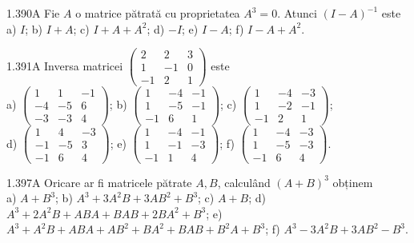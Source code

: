 \documentclass[11pt]{article}
\begin{document}
1.390A Fie $A$ o matrice pătrată cu proprietatea $A^{3}=0$. Atunci $(I-A)^{-1}$ este\\ a) $I$; b) $I+A$; c) $I+A+A^{2}$; d) $-I$; e) $I-A$; f) $I-A+A^{2}$.

1.391A Inversa matricei $\left(\begin{array}{ccc}2 & 2 & 3 \\ 1 & -1 & 0 \\ -1 & 2 & 1\end{array}\right)$ este\\ a) $\left(\begin{array}{ccc}1 & 1 & -1 \\ -4 & -5 & 6 \\ -3 & -3 & 4\end{array}\right)$; b) $\left(\begin{array}{ccc}1 & -4 & -1 \\ 1 & -5 & -1 \\ -1 & 6 & 1\end{array}\right)$; c) $\left(\begin{array}{ccc}1 & -4 & -3 \\ 1 & -2 & -1 \\ -1 & 2 & 1\end{array}\right)$;\\ d) $\left(\begin{array}{ccc}1 & 4 & -3 \\ -1 & -5 & 3 \\ -1 & 6 & 4\end{array}\right)$; e) $\left(\begin{array}{ccc}1 & -4 & -1 \\ 1 & -1 & -3 \\ -1 & 1 & 4\end{array}\right)$; f) $\left(\begin{array}{ccc}1 & -4 & -3 \\ 1 & -5 & -3 \\ -1 & 6 & 4\end{array}\right)$.

1.397A Oricare ar fi matricele pătrate $A, B$, calculând $(A+B)^{3}$ obținem\\ a) $A+B^{3}$; b) $A^{3}+3 A^{2} B+3 A B^{2}+B^{3}$; c) $A+B$; d) $A^{3}+2 A^{2} B+A B A+B A B+2 B A^{2}+B^{3}$; e) $A^{3}+A^{2} B+A B A+A B^{2}+B A^{2}+B A B+B^{2} A+B^{3}$; f) $A^{3}-3 A^{2} B+3 A B^{2}-B^{3}$.
\end{document}
